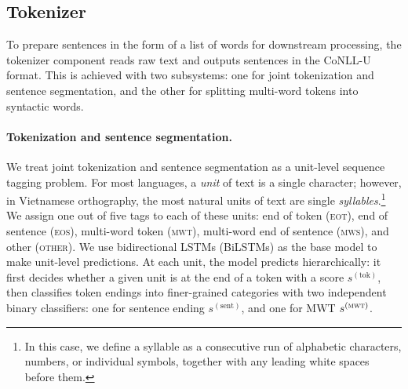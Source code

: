 \documentclass[11pt,a4paper]{article}
\newcommand{\conllu}{CoNLL-U}
\begin{document}
\subsection{Tokenizer} \label{sec:tok}

To prepare sentences in the form of a list of words for downstream processing, the tokenizer component reads raw text and outputs sentences in the \conllu{} format.
This is achieved with two subsystems: one for joint tokenization and sentence segmentation, and the other for splitting multi-word tokens into syntactic words. 

\paragraph{Tokenization and sentence segmentation.} We treat joint tokenization and sentence segmentation as a unit-level sequence tagging problem.
For most languages, a \emph{unit} of text is a single character; however, in Vietnamese orthography, the most natural units of text are single \emph{syllables}.\footnote{In this case, we define a syllable as a consecutive run of alphabetic characters, numbers, or individual symbols, together with any leading white spaces before them.}
We assign one out of five tags to each of these units: end of token (\textsc{eot}), end of sentence (\textsc{eos}), multi-word token (\textsc{mwt}), multi-word end of sentence (\textsc{mws}), and other (\textsc{other}).
We use bidirectional LSTMs (BiLSTMs) as the base model to make unit-level predictions.
At each unit, the model predicts hierarchically: it first decides whether a given unit is at the end of a token with a score $s^{(\text{tok})}$, then classifies token endings into finer-grained categories with two independent binary classifiers: one for sentence ending $s^{(\text{sent})}$, and one for MWT $s^{(\textsc{mwt})}$.
\end{document}
